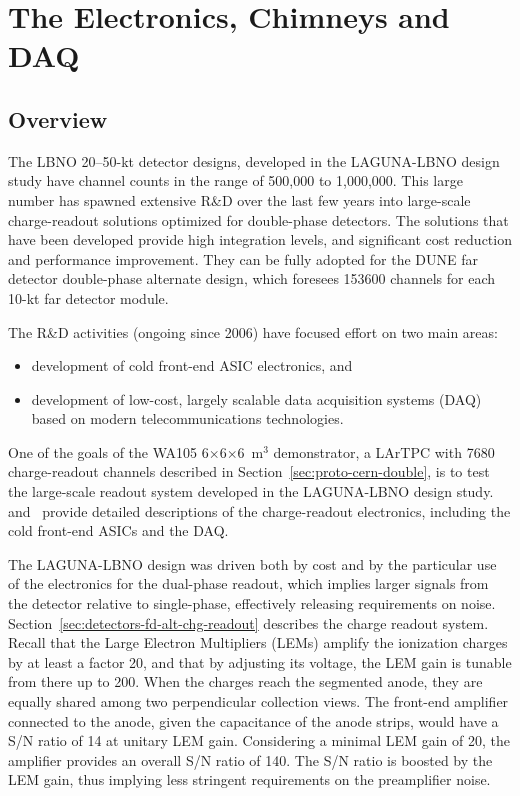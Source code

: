 \section{The Electronics, Chimneys and DAQ}
\label{sec:detectors-fd-alt-elec}

\subsection{Overview}
\label{sec:fd-alt-elec-ovvw}

The LBNO 20--50-kt detector designs, developed in the LAGUNA-LBNO
design study have channel counts in the range of 500,000 to 1,000,000.
This large number has spawned extensive R\&D over the last few years
into large-scale charge-readout solutions optimized for double-phase detectors.  
The solutions that have been developed provide high integration levels, and significant cost
reduction and performance improvement. They can be fully adopted for
the DUNE far detector double-phase alternate design, which  foresees
153600 channels for each 10-kt far detector module.

The R\&D activities (ongoing since 2006) have focused effort on two
main areas:
\begin {itemize} 
\item{development of cold front-end ASIC electronics, and}
\item{development of low-cost, largely scalable data 
acquisition systems (DAQ) based on modern telecommunications technologies.}
\end{itemize}

One of the goals of the WA105 6$\times$6$\times$6~m$^3$ demonstrator,
a LArTPC with \num{7680} charge-readout channels described in Section~\ref{sec:proto-cern-double}, is to test the
large-scale readout system developed in the LAGUNA-LBNO design
study. \anxdualtdr{}~\cite{WA105_TDR} and~\cite{WA105_SREP} provide detailed descriptions
of the charge-readout electronics, including the cold front-end ASICs
and the DAQ.

The LAGUNA-LBNO design was driven both by cost and by the particular use of the
electronics for the dual-phase readout, which implies larger signals
from the detector relative to single-phase, effectively releasing requirements on noise. 
Section~\ref{sec:detectors-fd-alt-chg-readout} describes
the charge readout system.  Recall that the Large Electron Multipliers (LEMs) 
amplify the ionization charges by at least a factor 20, and that by 
adjusting its voltage, the LEM gain is tunable from there
up to 200. When the charges reach the segmented anode, they are
equally shared among two perpendicular collection views.
The front-end amplifier connected to the anode, given the capacitance
of the anode strips, would have a S/N ratio of 14 at unitary LEM gain. 
Considering a minimal LEM gain of 20, the amplifier provides an
overall S/N ratio of 140. The S/N ratio is boosted by the LEM gain, thus 
implying less stringent requirements on the preamplifier noise.

